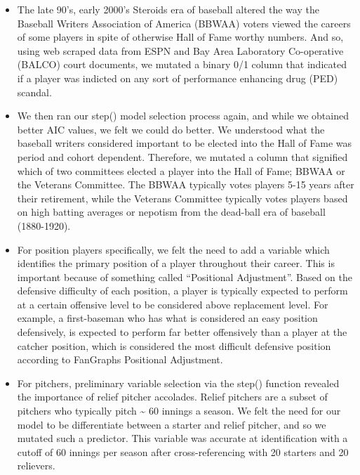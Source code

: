 \documentclass[
]{article}
\begin{document}
\begin{itemize}
\item
  The late 90's, early 2000's Steroids era of baseball altered the way
  the Baseball Writers Association of America (BBWAA) voters viewed the
  careers of some players in spite of otherwise Hall of Fame worthy
  numbers. And so, using web scraped data from ESPN and Bay Area
  Laboratory Co-operative (BALCO) court documents, we mutated a binary
  0/1 column that indicated if a player was indicted on any sort of
  performance enhancing drug (PED) scandal.
\item
  We then ran our step() model selection process again, and while we
  obtained better AIC values, we felt we could do better. We understood
  what the baseball writers considered important to be elected into the
  Hall of Fame was period and cohort dependent. Therefore, we mutated a
  column that signified which of two committees elected a player into
  the Hall of Fame; BBWAA or the Veterans Committee. The BBWAA typically
  votes players 5-15 years after their retirement, while the Veterans
  Committee typically votes players based on high batting averages or
  nepotism from the dead-ball era of baseball (1880-1920).
\item
  For position players specifically, we felt the need to add a variable
  which identifies the primary position of a player throughout their
  career. This is important because of something called ``Positional
  Adjustment''. Based on the defensive difficulty of each position, a
  player is typically expected to perform at a certain offensive level
  to be considered above replacement level. For example, a first-baseman
  who has what is considered an easy position defensively, is expected
  to perform far better offensively than a player at the catcher
  position, which is considered the most difficult defensive position
  according to FanGraphs Positional Adjustment.
\item
  For pitchers, preliminary variable selection via the step() function
  revealed the importance of relief pitcher accolades. Relief pitchers
  are a subset of pitchers who typically pitch \textasciitilde{} 60
  innings a season. We felt the need for our model to be differentiate
  between a starter and relief pitcher, and so we mutated such a
  predictor. This variable was accurate at identification with a cutoff
  of 60 innings per season after cross-referencing with 20 starters and
  20 relievers.
\end{itemize}
\end{document}
